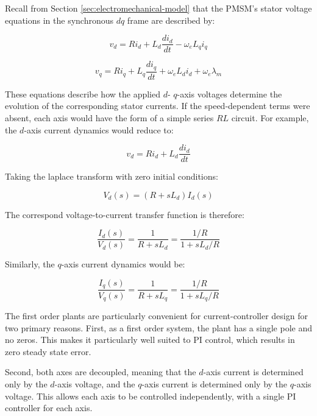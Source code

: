 \documentclass{article}
\begin{document}
Recall from Section \ref{sec:electromechanical-model} that the PMSM's stator voltage equations in the synchronous $dq$ frame are described by:

\begin{equation}
    v_d = Ri_d + L_d\frac{di_d}{dt} - \omega_eL_qi_q
\end{equation}

\begin{equation}
    v_q = Ri_q + L_q\frac{di_q}{dt} + \omega_eL_di_d + \omega_e\lambda_m
\end{equation}

These equations describe how the applied $d$- $q$-axis voltages determine the evolution of the corresponding stator currents. If the speed-dependent terms were absent, each axis would have the form of a simple series $RL$ circuit. For example, the $d$-axis current dynamics would reduce to:

\begin{equation}
    v_d = Ri_d + L_d\frac{di_d}{dt}
\end{equation}

Taking the laplace transform with zero initial conditions:

\begin{equation}
    V_d(s) = (R + sL_d)I_d(s)
\end{equation}

The correspond voltage-to-current transfer function is therefore:

\begin{equation}
    \frac{I_d(s)}{V_d(s)} = \frac{1}{R + sL_d} = \frac{1/R}{1 + sL_d/R}
\end{equation}

Similarly, the $q$-axis current dynamics would be:

\begin{equation}
    \frac{I_q(s)}{V_q(s)} = \frac{1}{R + sL_q} = \frac{1/R}{1 + sL_q/R}
\end{equation}

The first order plants are particularly convenient for current-controller design for two primary reasons. First, as a first order system, the plant has a single pole and no zeros. This makes it particularly well suited to PI control, which results in zero steady state error. 

Second, both axes are decoupled, meaning that the $d$-axis current is determined only by the $d$-axis voltage, and the $q$-axis current is determined only by the $q$-axis voltage. This allows each axis to be controlled independently, with a single PI controller for each axis.
\end{document}
